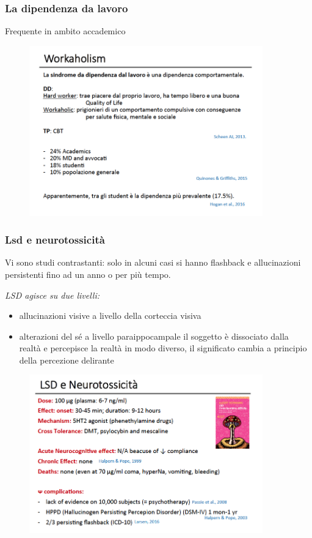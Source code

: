 \subsubsection{La dipendenza da lavoro}

Frequente in ambito accademico

\begin{figure}[!ht]
\centering
	\includegraphics[width=0.9\textwidth]{017/image23.png}
\end{figure}

\subsubsection{Lsd e neurotossicità}

Vi sono studi contrastanti: solo in alcuni casi si hanno flashback e
allucinazioni persistenti fino ad un anno o per più tempo.

\emph{LSD agisce su due livelli:}

\begin{itemize}
\item
  allucinazioni visive a livello della corteccia visiva
\item
  alterazioni del sé a livello paraippocampale il soggetto è
  dissociato dalla realtà e percepisce la realtà in modo diverso, il
  significato cambia a principio della percezione delirante
  
\end{itemize}

\begin{figure}[!ht]
\centering
	\includegraphics[width=0.9\textwidth]{017/image24.png}
\end{figure}


